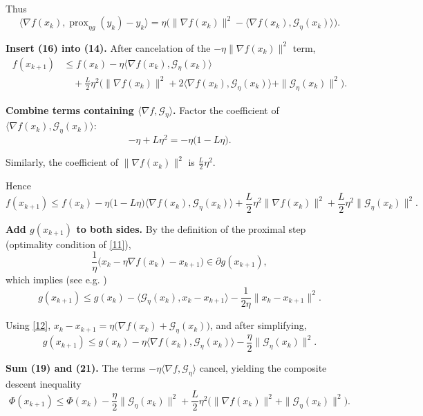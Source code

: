 \documentclass{article}
\begin{document}
\begin{enumerate}[label={[\textbf{Step \arabic*.}]},leftmargin=*,align=left]
Thus
\[
\langle\nabla f(x_k),\operatorname{prox}_{\eta g}(y_k)-y_k\rangle
= \eta\big(\|\nabla f(x_k)\|^{2}
          -\langle\nabla f(x_k),\mathcal{G}_{\eta}(x_k)\rangle\big).
\tag{16}
\]

\item \textbf{Insert (16) into (14).} After cancelation of the $-\eta\|\nabla f(x_k)\|^{2}$ term,
\[
\begin{aligned}
f(x_{k+1}) &\le f(x_k)
            -\eta\langle\nabla f(x_k),\mathcal{G}_{\eta}(x_k)\rangle   \\
           &\quad+\frac{L}{2}\eta^{2}\Big(\|\nabla f(x_k)\|^{2}
           +2\langle\nabla f(x_k),\mathcal{G}_{\eta}(x_k)\rangle
           +\|\mathcal{G}_{\eta}(x_k)\|^{2}\Big).
\end{aligned}
\tag{17}
\]

\item \textbf{Combine terms containing $\langle\nabla f,\mathcal{G}_{\eta}\rangle$.}  
Factor the coefficient of $\langle\nabla f(x_k),\mathcal{G}_{\eta}(x_k)\rangle$:
\[
-\eta + L\eta^{2}= -\eta\big(1-L\eta\big).
\tag{18}
\]

Similarly, the coefficient of $\|\nabla f(x_k)\|^{2}$ is $\frac{L}{2}\eta^{2}$.

Hence
\[
f(x_{k+1})\le f(x_k)
            -\eta\big(1-L\eta\big)\langle\nabla f(x_k),\mathcal{G}_{\eta}(x_k)\rangle
            +\frac{L}{2}\eta^{2}\|\nabla f(x_k)\|^{2}
            +\frac{L}{2}\eta^{2}\|\mathcal{G}_{\eta}(x_k)\|^{2}.
\tag{19}
\]

\item \textbf{Add $g(x_{k+1})$ to both sides.} By the definition of the proximal step (optimality condition of \eqref{11}),
\[
\frac{1}{\eta}\big(x_k-\eta\nabla f(x_k)-x_{k+1}\big)\in\partial g(x_{k+1}),
\]
which implies (see e.g. \cite{Parikh2014})
\[
g(x_{k+1})\le g(x_k)-\langle\mathcal{G}_{\eta}(x_k),x_k-x_{k+1}\rangle-\frac{1}{2\eta}\|x_k-x_{k+1}\|^{2}.
\tag{20}
\]

Using \eqref{12}, $x_k-x_{k+1}= \eta\big(\nabla f(x_k)+\mathcal{G}_{\eta}(x_k)\big)$, and after simplifying,
\[
g(x_{k+1})\le g(x_k)-\eta\langle\nabla f(x_k),\mathcal{G}_{\eta}(x_k)\rangle
            -\frac{\eta}{2}\|\mathcal{G}_{\eta}(x_k)\|^{2}.
\tag{21}
\]

\item \textbf{Sum (19) and (21).} The terms $-\eta\langle\nabla f,\mathcal{G}_{\eta}\rangle$ cancel, yielding the composite descent inequality
\[
\Phi(x_{k+1})\le \Phi(x_k)-\frac{\eta}{2}\|\mathcal{G}_{\eta}(x_k)\|^{2}
               +\frac{L}{2}\eta^{2}\Big(\|\nabla f(x_k)\|^{2}
               +\|\mathcal{G}_{\eta}(x_k)\|^{2}\Big).
\tag{22}
\]


\end{enumerate}
\end{document}
